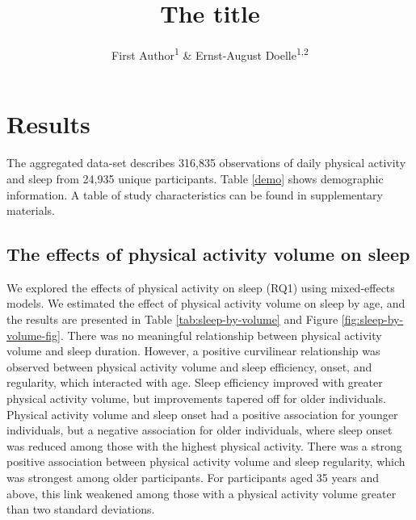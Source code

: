 \documentclass[
  man]{apa6}
\title{The title}
\author{First Author\textsuperscript{1} \& Ernst-August Doelle\textsuperscript{1,2}}
\date{}
\affiliation{\vspace{0.5cm}\textsuperscript{1} Wilhelm-Wundt-University\\\textsuperscript{2} Konstanz Business School}
\begin{document}
\maketitle

\hypertarget{results}{%
\section{Results}\label{results}}

The aggregated data-set describes 316,835 observations of daily physical activity and sleep from 24,935 unique participants. Table \ref{demo} shows demographic information. A table of study characteristics can be found in supplementary materials.

\hypertarget{the-effects-of-physical-activity-volume-on-sleep}{%
\subsection{The effects of physical activity volume on sleep}\label{the-effects-of-physical-activity-volume-on-sleep}}

We explored the effects of physical activity on sleep (RQ1) using mixed-effects models. We estimated the effect of physical activity volume on sleep by age, and the results are presented in Table \ref{tab:sleep-by-volume} and Figure \ref{fig:sleep-by-volume-fig}. There was no meaningful relationship between physical activity volume and sleep duration. However, a positive curvilinear relationship was observed between physical activity volume and sleep efficiency, onset, and regularity, which interacted with age. Sleep efficiency improved with greater physical activity volume, but improvements tapered off for older individuals. Physical activity volume and sleep onset had a positive association for younger individuals, but a negative association for older individuals, where sleep onset was reduced among those with the highest physical activity. There was a strong positive association between physical activity volume and sleep regularity, which was strongest among older participants. For participants aged 35 years and above, this link weakened among those with a physical activity volume greater than two standard deviations.

\renewcommand{\arraystretch}{0.7}
\end{document}
